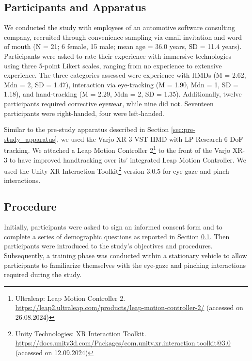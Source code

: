 \subsection{Participants and Apparatus}
\label{sec:study_participants_apparatus}
We conducted the study with employees of an automotive software consulting company, recruited through convenience sampling via email invitation and word of mouth (N = 21; 6 female, 15 male; mean age = 36.0 years, SD = 11.4 years). Participants were asked to rate their experience with immersive technologies using three 5-point Likert scales, ranging from no experience to extensive experience. The three categories assessed were experience with HMDs (M = 2.62, Mdn = 2, SD = 1.47), interaction via eye-tracking (M = 1.90, Mdn = 1, SD = 1.18), and hand-tracking (M = 2.29, Mdn = 2, SD = 1.35). Additionally, twelve participants required corrective eyewear, while nine did not. Seventeen participants were right-handed, four were left-handed.

Similar to the pre-study apparatus described in Section \ref{sec:pre-study_apparatus}, we used the Varjo XR-3 VST HMD with LP-Research 6-DoF tracking. We attached a Leap Motion Controller 2\footnote{\label{foot:Leapmotion2}Ultraleap: Leap Motion Controller 2. \url{https://leap2.ultraleap.com/products/leap-motion-controller-2/} (accessed on 26.08.2024)} to the front of the Varjo XR-3 to have improved handtracking over its' integrated Leap Motion Controller. We used the Unity XR Interaction Toolkit\footnote{Unity Technologies: XR Interaction Toolkit. \url{https://docs.unity3d.com/Packages/com.unity.xr.interaction.toolkit@3.0} (accessed on 12.09.2024)} version 3.0.5 for eye-gaze and pinch interactions.


\subsection{Procedure}
\label{sec:study_procedure}
Initially, participants were asked to sign an informed consent form and to complete a series of demographic questions as reported in Section \ref{sec:study_participants_apparatus}. Then participants were introduced to the study's objectives and procedures. Subsequently, a training phase was conducted within a stationary vehicle to allow participants to familiarize themselves with the eye-gaze and pinching interactions required during the study.

